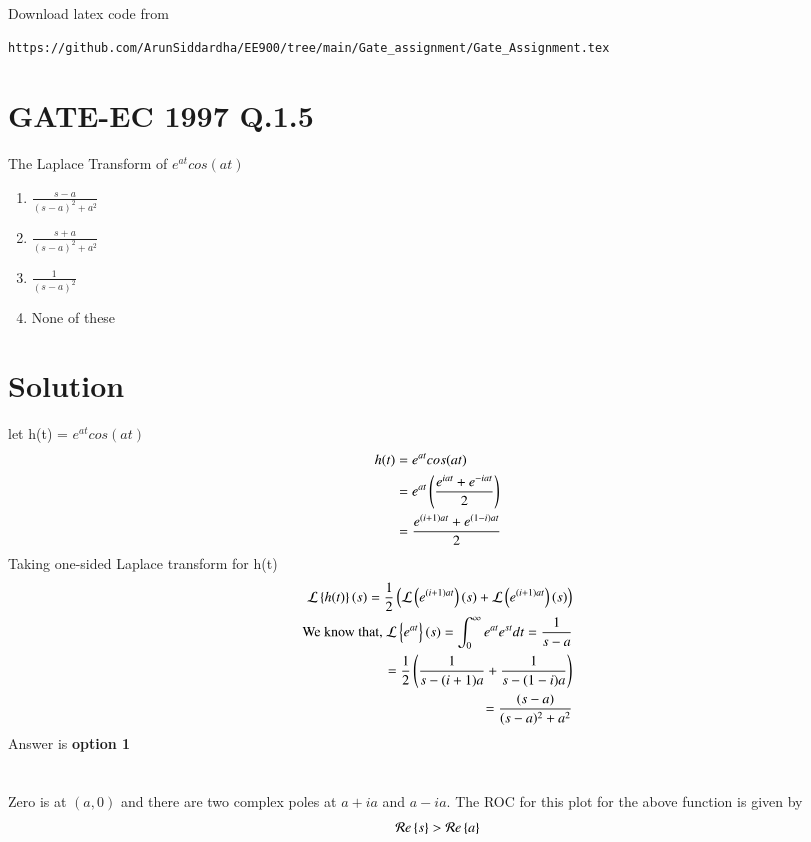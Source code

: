 \documentclass[journal,12pt,twocolumn]{IEEEtran}
\theoremstyle{plain}
\theoremstyle{definition}
\theoremstyle{remark}
\begin{document}
%
Download latex code from 
%
\begin{lstlisting}
https://github.com/ArunSiddardha/EE900/tree/main/Gate_assignment/Gate_Assignment.tex
\end{lstlisting}

\section*{GATE-EC 1997 Q.1.5}
The Laplace Transform of $e^{a t}cos(a t)$ 
\begin{enumerate}
    \item $\frac{s-a}{(s - a)^2 + a^2}$\\
  \item $\frac{s+a}{(s - a)^2 + a^2}$\\
  \item $\frac{1}{(s - a)^2}$\\
  \item None of these
\end{enumerate}
\section*{Solution}
let h(t) = $e^{a t}cos(a t)$  \\ 
\begin{align}
    h(t)&=e^{a t}cos(a t)\\
        &= e^{a t}\left(\frac{e^{i a t} + e^{-i a t}}{2}\right)\\
        &=\frac{e^{(i+1) a t} + e^{(1-i) a t}}{2}
\end{align}
Taking one-sided Laplace transform for h(t)
\begin{align}
    \mathcal{L}\left\{h(t)\right\}(s)= \frac{1}{2}\left(\mathcal{L}\left(e^{(i+1) a t}\right)(s)+\mathcal{L}\left(e^{(i+1) a t}\right)(s)\right)\\
    \text{We know that, }
    \mathcal{L}\left\{e^{at}\right\}(s)=\int^{\infty}_{0}e^{a t}e^{st}dt=\frac{1}{s-a} \\
    =\frac{1}{2}\left(\frac{1}{s-(i+1)a}+ \frac{1}{s-(1-i)a}\right)\\
    =\frac{(s-a)}{(s-a)^2+a^2}
\end{align}
Answer is \textbf{option 1}\\\\\\
Zero is at $(a,0)$ and there are two complex poles at $a + ia$ and $a-ia$.
The ROC for this plot for the above function is given by 
\begin{align}
    \mathcal{R}e\left\{s\right\}>\mathcal{R}e\left\{a\right\}
\end{align}
\end{document}
